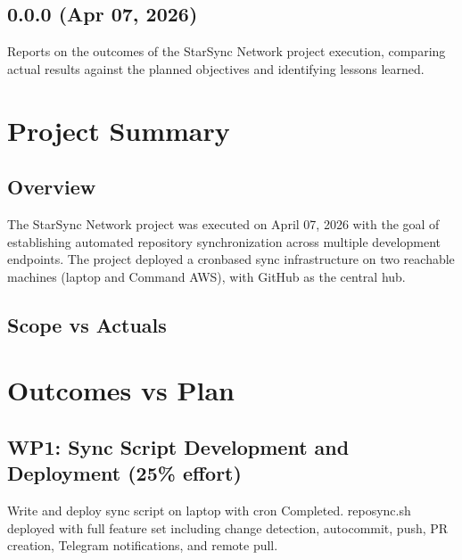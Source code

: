 \documentclass[letterpaper,10pt,openany,oneside,english]{sphinxmanual}
\begin{document}
\subsection{0.0.0 (Apr 07, 2026)}
\label{\detokenize{releasenotes:apr-07-2026}}
\sphinxAtStartPar
{}

\sphinxAtStartPar
Reports on the outcomes of the StarSync Network project execution, comparing
actual results against the planned objectives and identifying lessons learned.

\sphinxstepscope


\section{Project Summary}
\label{\detokenize{project_summary:project-summary}}\label{\detokenize{project_summary::doc}}

\subsection{Overview}
\label{\detokenize{project_summary:overview}}
\sphinxAtStartPar
The StarSync Network project was executed on April 07, 2026 with the goal of
establishing automated repository synchronization across multiple development
endpoints. The project deployed a cron\sphinxhyphen{}based sync infrastructure on two
reachable machines (laptop and Command AWS), with GitHub as the central hub.


\subsection{Scope vs Actuals}
\label{\detokenize{project_summary:scope-vs-actuals}}
\sphinxstepscope


\section{Outcomes vs Plan}
\label{\detokenize{outcomes_vs_plan:outcomes-vs-plan}}\label{\detokenize{outcomes_vs_plan::doc}}

\subsection{WP1: Sync Script Development and Deployment (25\% effort)}
\label{\detokenize{outcomes_vs_plan:wp1-sync-script-development-and-deployment-25-effort}}
\sphinxAtStartPar
{} Write and deploy sync script on laptop with cron
 Completed. repo\sphinxhyphen{}sync.sh deployed with full feature set including
change detection, auto\sphinxhyphen{}commit, push, PR creation, Telegram notifications,
and remote pull.
\end{document}
